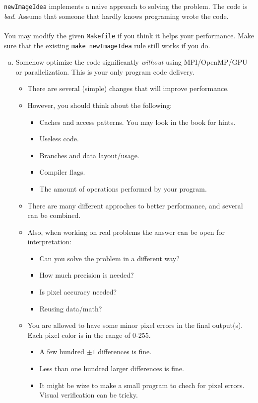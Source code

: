 \documentclass[10pt,a4paper]{article}
\begin{document}
\texttt{newImageIdea} implements a naive approach to solving the problem. The code is \emph{bad}. Assume that someone that hardly knows programing wrote the code.
\\
\\
You may modify the given \texttt{Makefile} if you think it helps your performance. Make sure that the existing \texttt{make newImageIdea} rule still works if you do.
\begin{enumerate}[a)]

	\item Somehow optimize the code significantly \emph {without} using MPI/OpenMP/GPU or parallelization. This is your only program code delivery.

\begin{itemize}
	\item There are several (simple) changes that will improve performance.
	\item However, you should think about the following:
	\begin{itemize}
		\item Caches and access patterns. You may look in the book for hints.
		\item Useless code.
		\item Branches and data layout/usage.
		\item Compiler flags.
		\item The amount of operations performed by your program.
	\end{itemize}
	\item There are many different approches to better performance, and several can be combined.
	\item Also, when working on real problems the answer can be open for interpretation: 
	\begin{itemize}
		\item Can you solve the problem in a different way?
		\item How much precision is needed?
		\item Is pixel accuracy needed?
		\item Reusing data/math?
	\end{itemize}
	\item You are allowed to have some minor pixel errors in the final output(s). Each pixel color is in the range of 0-255.
	\begin{itemize}
		\item A few hundred $\pm 1$ differences is fine.
		\item Less than one hundred larger differences is fine.
		\item It might be wize to make a small program to chech for pixel errors. Visual verification can be tricky.
	\end{itemize}


\end{itemize}
\end{enumerate}
\end{document}
